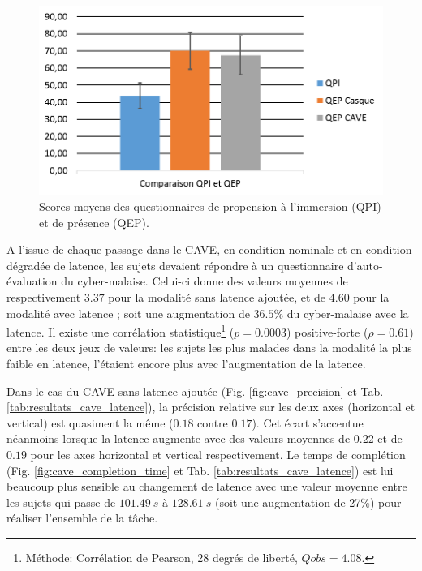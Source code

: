 	\begin{figure}[h]
		\centering
		\includegraphics[width=0.8\linewidth]{Figures/ITQvPQ.png}
		\caption{Scores moyens des questionnaires de propension à l'immersion (QPI) et de présence (QEP).}
		\label{fig:itq_pq}
	\end{figure}
	
	\par A l'issue de chaque passage dans le CAVE, en condition nominale et en condition dégradée de latence, les sujets devaient répondre à un questionnaire d'auto-évaluation du cyber-malaise. Celui-ci donne des valeurs moyennes de respectivement $3.37$ pour la modalité sans latence ajoutée, et de $4.60$ pour la modalité avec latence ; soit une augmentation de $36.5\%$ du cyber-malaise avec la latence. Il existe une corrélation statistique\footnote{Méthode: Corrélation de Pearson, 28 degrés de liberté, $Qobs = 4.08$.} ($p = 0.0003$) positive-forte ($\rho = 0.61$) entre les deux jeux de valeurs: les sujets les plus malades dans la modalité la plus faible en latence, l'étaient encore plus avec l'augmentation de la latence.
	
	\par Dans le cas du CAVE sans latence ajoutée (Fig. \ref{fig:cave_precision} et Tab. \ref{tab:resultats_cave_latence}), la précision relative sur les deux axes (horizontal et vertical) est quasiment la même ($0.18$ contre $0.17$). Cet écart s'accentue néanmoins lorsque la latence augmente avec des valeurs moyennes de $0.22$ et de $0.19$ pour les axes horizontal et vertical respectivement. Le temps de complétion (Fig. \ref{fig:cave_completion_time} et Tab. \ref{tab:resultats_cave_latence}) est lui beaucoup plus sensible au changement de latence avec une valeur moyenne entre les sujets qui passe de $101.49~s$ à $128.61~s$ (soit une augmentation de 27\%) pour réaliser l'ensemble de la tâche.

